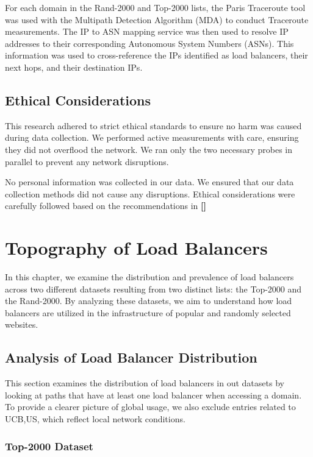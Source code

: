 \documentclass[12pt]{cwru_thesis}
\begin{document}
For each domain in the Rand-2000 and Top-2000 lists, the Paris Traceroute tool was used with the Multipath Detection Algorithm (MDA) to conduct Traceroute measurements. The IP to ASN mapping service was then used to resolve IP addresses to their corresponding Autonomous System Numbers (ASNs). This information was used to cross-reference the IPs identified as load balancers, their next hops, and their destination IPs.

\section{Ethical Considerations}

This research adhered to strict ethical standards to ensure no harm was caused during data collection. We performed active measurements with care, ensuring they did not overflood the network. We ran only the two necessary probes in parallel to prevent any network disruptions.

No personal information was collected in our data. We ensured that our data collection methods did not cause any disruptions. Ethical considerations were carefully followed based on the recommendations in \textbf{[\cite{partridge2016ethical}]}



\chapter{Topography of Load Balancers}

In this chapter, we examine the distribution and prevalence of load balancers across two different datasets resulting from two distinct lists: the Top-2000 and the Rand-2000. By analyzing these datasets, we aim to understand how load balancers are utilized in the infrastructure of popular and randomly selected websites.

\section{Analysis of Load Balancer Distribution}

This section examines the distribution of load balancers in out datasets by looking at paths that have at least one load balancer when accessing a domain. To provide a clearer picture of global usage, we also exclude entries related to UCB,US, which reflect local network conditions. 

\subsection{Top-2000 Dataset}
\end{document}
